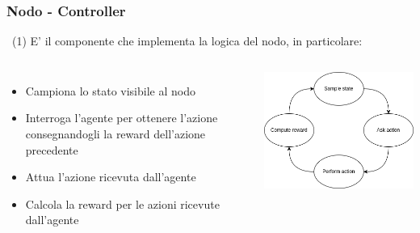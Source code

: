 \documentclass[compress]{beamer}
\begin{document}
\subsubsection*{Nodo - Controller}
\begin{frame}{\subsubsecname\ (1)}
E' il componente che implementa la logica del nodo, in particolare:
\vspace{0.5cm}
    \begin{columns}
            \begin{minipage}[b]{1\textwidth}
                \begin{itemize}
                    \item Campiona lo stato visibile al nodo
                    \item Interroga l'agente per ottenere l'azione consegnandogli la reward dell'azione precedente
                    \item Attua l'azione ricevuta dall'agente
                    \item Calcola la reward per le azioni ricevute dall'agente
                \end{itemize}
            \end{minipage}
            \begin{minipage}{.9\textwidth}
                \begin{adjustbox}{margin=0.5cm 0cm 0.1cm 0.2cm, center} %
                    \includegraphics[width=1\textwidth]{figs/control_loop.png}
                \end{adjustbox}
            \end{minipage}
    \end{columns}
\end{frame}
\end{document}
